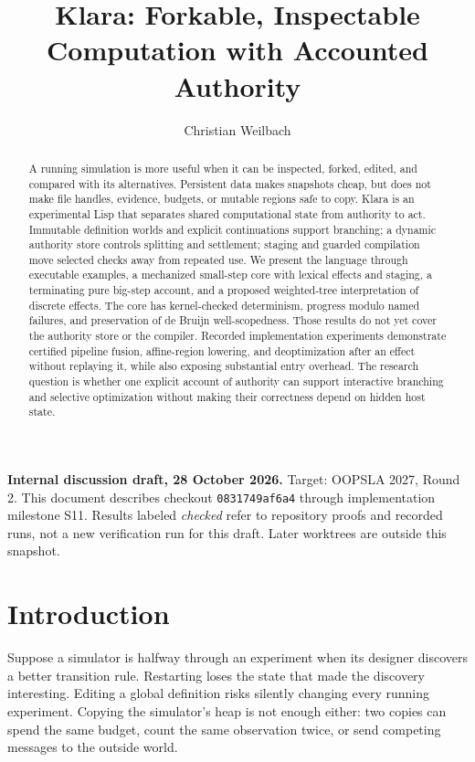 \documentclass[acmsmall,screen,review,nonacm]{acmart}
\title{Klara: Forkable, Inspectable Computation with Accounted Authority}
\author{Christian Weilbach}
\newcommand{\src}[1]{{\normalfont\nolinkurl{#1}}}
\begin{document}
\begin{abstract}
A running simulation is more useful when it can be inspected, forked, edited,
and compared with its alternatives. Persistent data makes snapshots cheap,
but does not make file handles, evidence, budgets, or mutable regions safe to
copy. Klara is an experimental Lisp that separates shared computational state
from authority to act. Immutable definition worlds and explicit continuations
support branching; a dynamic authority store controls splitting and settlement;
staging and guarded compilation move selected checks away from repeated use.
We present the language through executable examples, a mechanized small-step
core with lexical effects and staging, a terminating pure big-step account,
and a proposed weighted-tree interpretation of discrete effects. The core has
kernel-checked determinism, progress modulo named failures, and preservation
of de Bruijn well-scopedness. Those results do not yet cover the authority
store or the compiler. Recorded implementation experiments demonstrate certified
pipeline fusion, affine-region lowering, and deoptimization after an effect
without replaying it, while also exposing substantial entry overhead. The
research question is whether one explicit account of authority can support
interactive branching and selective optimization without making their
correctness depend on hidden host state.
\end{abstract}
\maketitle
\noindent\textbf{Internal discussion draft, 28 October 2026.}
Target: OOPSLA 2027, Round 2. This document describes checkout
\src{0831749af6a4} through implementation milestone S11. Results labeled
\emph{checked} refer to repository proofs and recorded runs, not a new
verification run for this draft. Later worktrees are outside this snapshot.

\section{Introduction}
Suppose a simulator is halfway through an experiment when its designer discovers
a better transition rule. Restarting loses the state that made the discovery
interesting. Editing a global definition risks silently changing every running
experiment. Copying the simulator's heap is not enough either: two copies can
spend the same budget, count the same observation twice, or send competing
messages to the outside world.
\end{document}
